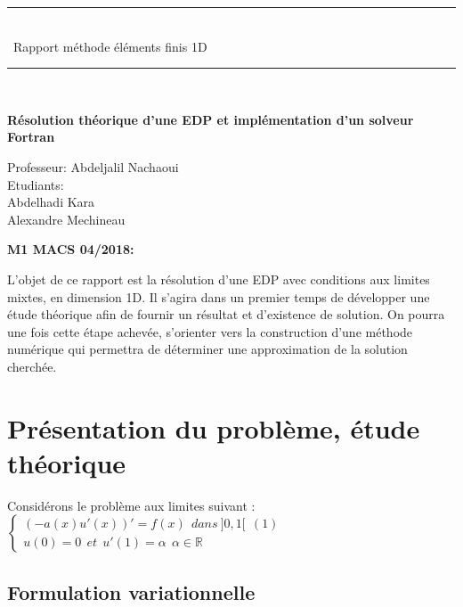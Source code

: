 \documentclass[a4paper,french,10pt]{article}
\begin{document}
\begin{titlepage}
	\centering
    
    \vspace{1cm}
	\rule{\linewidth}{0.2 mm} \\[0.4 cm]
	{ \huge\ Rapport méthode éléments finis 1D}\\
	\rule{\linewidth}{0.2 mm} \\[1.5 cm]

\vspace{-2cm}
\begin{center}
\end{center}
\begin{center}
\Large{\textbf{Résolution théorique d'une EDP et implémentation d'un solveur Fortran}}\\
\end{center}



\vspace{2cm}
Professeur: Abdeljalil Nachaoui\\
Etudiants:\\
Abdelhadi Kara\\
Alexandre Mechineau\\


\vspace{1 cm}

\textbf{\large{M1 MACS 04/2018:}}
\vspace{0.5cm}


\vspace{1 cm}
\vfill
	
\end{titlepage}

\newpage
\abstract{}
L'objet de ce rapport est la résolution d'une EDP avec conditions aux limites mixtes, en dimension 1D. Il s'agira dans un premier temps de développer une étude théorique afin de fournir un résultat et d’existence de solution. On pourra une fois cette étape achevée, s'orienter vers la construction d'une méthode numérique qui permettra de déterminer une approximation de la solution cherchée.

\newpage\section{Présentation du problème, étude théorique}

Considérons le problème aux limites suivant :
\newline\newline  $\left\{
\begin{array}{l}
  (-a(x)u'(x))'=f(x)~~dans~]0,1[~~(1) \\
  u(0)=0~~ et~~u'(1)= \alpha~~\alpha \in \mathds{R}
\end{array}
\right.$
\newline\newline\subsection{Formulation variationnelle}
\end{document}
